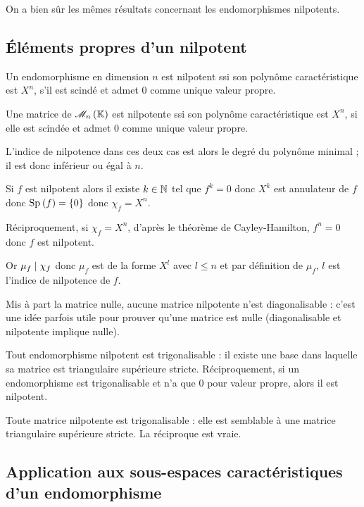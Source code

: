 On a bien sûr les mêmes résultats concernant les endomorphismes nilpotents.

\subsection{Éléments propres d'un nilpotent}

\begin{prop}
Un endomorphisme en dimension \(n\) est nilpotent ssi son polynôme caractéristique est \(X^n\), \ie s'il est scindé et admet \(0\) comme unique valeur propre.

Une matrice de \(\M{n}\) est nilpotente ssi son polynôme caractéristique est \(X^n\), \ie si elle est scindée et admet \(0\) comme unique valeur propre.

L'indice de nilpotence dans ces deux cas est alors le degré du polynôme minimal ; il est donc inférieur ou égal à \(n\).
\end{prop}

\begin{dem}
Si \(f\) est nilpotent alors il existe \(k\in\mathbb{N}\) tel que \(f^k=0\) donc \(X^k\) est annulateur de \(f\) donc \(\Sp{f}=\accol{0}\) donc \(\chi_f=X^n\).

Réciproquement, si \(\chi_f=X^n\), d'après le théorème de Cayley-Hamilton, \(f^n=0\) donc \(f\) est nilpotent.

Or \(\mu_f\mid\chi_f\) donc \(\mu_f\) est de la forme \(X^l\) avec \(l\leq n\) et par définition de \(\mu_f\), \(l\) est l'indice de nilpotence de \(f\).
\end{dem}

Mis à part la matrice nulle, aucune matrice nilpotente n'est diagonalisable : c'est une idée parfois utile pour prouver qu'une matrice est nulle (diagonalisable et nilpotente implique nulle).

\begin{prop}
Tout endomorphisme nilpotent est trigonalisable : il existe une base dans laquelle sa matrice est triangulaire supérieure stricte. Réciproquement, si un endomorphisme est trigonalisable et n'a que \(0\) pour valeur propre, alors il est nilpotent.

Toute matrice nilpotente est trigonalisable : elle est semblable à une matrice triangulaire supérieure stricte. La réciproque est vraie.
\end{prop}

\subsection{Application aux sous-espaces caractéristiques d'un endomorphisme}

